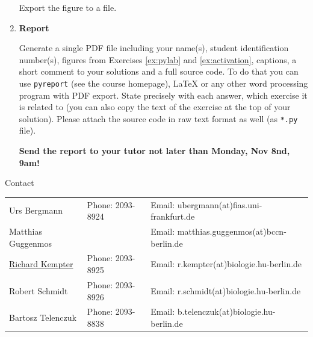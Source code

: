 \documentclass[12pt, a4]{article}
\begin{document}
\begin{enumerate}
\begin{enumerate}
        \end{enumerate}
    
        Export the figure to a file.

    \item \textbf {Report}

    Generate a single PDF file including your name(s), student identification number(s), figures from Exercises \ref{ex:pylab} and \ref{ex:activation}, captions, a short comment to your solutions and a full source code. To do that you can use  \texttt{pyreport} (see the course homepage), LaTeX or any other word processing program with PDF export. State precisely with each answer, which exercise it is related to (you can also copy the text of the exercise at the top of your solution). Please attach the source code in raw text format as well (as \texttt{*.py} file).
    
    \textbf{Send the report to your tutor not later than Monday, Nov 8nd, 9am!} 
\end{enumerate}

\vfill
\centerline{\CAP Contact}
\CAP

\begin{tabular}{lll}
Urs Bergmann & Phone: 2093-8924 & Email: ubergmann(at)fias.uni-frankfurt.de \\
Matthias Guggenmos & & Email: matthias.guggenmos(at)bccn-berlin.de \\
\underline{Richard Kempter} \hfill & Phone: 2093-8925 \hfill & Email: r.kempter(at)biologie.hu-berlin.de \\
Robert Schmidt & Phone: 2093-8926 & Email: r.schmidt(at)biologie.hu-berlin.de \\
Bartosz Telenczuk & Phone: 2093-8838 & Email: b.telenczuk(at)biologie.hu-berlin.de \\
\end{tabular}
\end{document}
